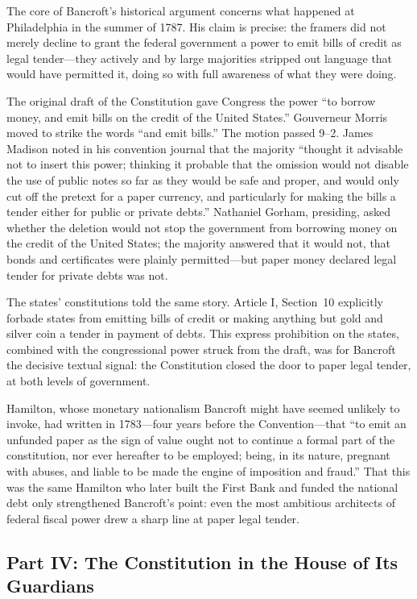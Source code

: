 \documentclass[12pt]{article}
\begin{document}
The core of Bancroft's historical argument concerns what happened at
Philadelphia in the summer of 1787. His claim is precise: the framers
did not merely decline to grant the federal government a power to emit
bills of credit as legal tender---they actively and by large majorities
stripped out language that would have permitted it, doing so with full
awareness of what they were doing.

The original draft of the Constitution gave Congress the power ``to
borrow money, and emit bills on the credit of the United States.'' Gouverneur
Morris moved to strike the words ``and emit bills.'' The motion passed
9--2. James Madison noted in his convention journal that the majority
``thought it advisable not to insert this power; thinking it probable
that the omission would not disable the use of public notes so far as
they would be safe and proper, and would only cut off the pretext for a
paper currency, and particularly for making the bills a tender either
for public or private debts.'' Nathaniel Gorham, presiding, asked whether
the deletion would not stop the government from borrowing money on the
credit of the United States; the majority answered that it would not, that
bonds and certificates were plainly permitted---but paper money declared
legal tender for private debts was not.

The states' constitutions told the same story. Article I, Section~10
explicitly forbade states from emitting bills of credit or making anything
but gold and silver coin a tender in payment of debts. This express
prohibition on the states, combined with the congressional power struck
from the draft, was for Bancroft the decisive textual signal: the
Constitution closed the door to paper legal tender, at both levels of
government.

Hamilton, whose monetary nationalism Bancroft might have seemed unlikely
to invoke, had written in 1783---four years before the Convention---that
``to emit an unfunded paper as the sign of value ought not to continue a
formal part of the constitution, nor ever hereafter to be employed; being,
in its nature, pregnant with abuses, and liable to be made the engine of
imposition and fraud.'' That this was the same Hamilton who later built
the First Bank and funded the national debt only strengthened Bancroft's
point: even the most ambitious architects of federal fiscal power drew a
sharp line at paper legal tender.

\subsection{Part IV: The Constitution in the House of Its Guardians}
\end{document}
